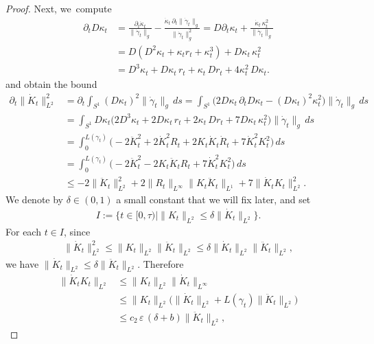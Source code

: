 \documentclass[JEP,XML,SOM,Unicode,NoFloatCountersInSection,published]{cedram}
\let\sep\mid
\let\epsilon\varepsilon
\theoremstyle{plain}
\theoremstyle{definition}
\begin{document}
\begin{proof}
Next, we~compute
\begin{align*}
\partial_t D\kappa_t
&=
\frac{\partial_t \dot \kappa_t}{\|\dot\gamma_t\|_g}
-
\frac{\dot \kappa_t\,\partial_t\|\dot\gamma_t\|_g}{\|\dot\gamma_t\|_g^2}
=
D\partial_t \kappa_t + \frac{\dot \kappa_t\,\kappa_t^2}{\|\dot\gamma_t\|_g}\\
&=
D(D^2 \kappa_t + \kappa_t r_t + \kappa_t^3) + D\kappa_t\,\kappa_t^2\\
&=
D^3 \kappa_t + D\kappa_t\, r_t + \kappa_t\,Dr_t + 4\kappa_t^2\,D\kappa_t .
\end{align*}
and obtain the bound
\begin{align*}
\partial_t \|\dot K_t\|_{L^2}^2
&=
\partial_t \int_{S^1} (D\kappa_t)^2\|\dot\gamma_t\|_g\,ds
=
\int_{S^1} \big(2 D\kappa_t\,\partial_tD\kappa_t - (D\kappa_t)^2\kappa_t^2 \big)\|\dot\gamma_t\|_g\,ds\\
&=
\int_{S^1} D\kappa_t\big(2 D^3\kappa_t + 2D\kappa_t\,r_t + 2\kappa_t\,Dr_t + 7D\kappa_t\,\kappa_t^2 \big)\|\dot\gamma_t\|_g\,ds\\
&=
\int_0^{L(\gamma_t)} \Big(\! -2 \ddot K_t^2 + 2\dot K_t^2 R_t + 2K_t \dot K_t \dot R_t + 7\dot K_t^2 K_t^2 \Big)\,ds\\
&=
\int_0^{L(\gamma_t)} \Big(\! -2 \ddot K_t^2 - 2 K_t \ddot K_t R_t + 7\dot K_t^2 K_t^2 \Big)\,ds\\
&\leq -2 \|\ddot K_t\|_{L^2}^2 + 2 \|R_t\|_{L^\infty} \|K_t \ddot K_t\|_{L^1} + 7 \|\dot K_t K_t\|_{L^2}^2.
\end{align*}
We denote by $\delta\in(0,1)$ a small constant that we will fix later, and set
\begin{align*}
I:=\big\{ t\in[0,\tau)\sep \|K_t\|_{L^2} \leq \delta \|\dot K_t\|_{L^2} \big\}.
\end{align*}
For each $t\in I$, since
\begin{align*}
\|\dot K_t\|_{L^2}^2
\leq
\|K_t\|_{L^2}\|\ddot K_t\|_{L^2}
\leq
\delta\|\dot K_t\|_{L^2}\|\ddot K_t\|_{L^2},
\end{align*}
we have $\|\dot K_t\|_{L^2}\leq \delta\|\ddot K_t\|_{L^2}$. Therefore
\begin{equation}
\label{e:Cinfty_Zoll_estimates_2_1}
\begin{split}
\|\dot K_t K_t\|_{L^2}
&\leq
\|K_t\|_{L^2} \|\dot K_t\|_{L^\infty}\\
&\leq
\|K_t\|_{L^2} \big(\|\dot K_t\|_{L^2} + L(\gamma_t)\|\ddot K_t\|_{L^2}\big)\\
&\leq
c_2\,\epsilon\,(\delta+b)\|\ddot K_t\|_{L^2},
\end{split}

\end{equation}
\end{proof}
\end{document}
